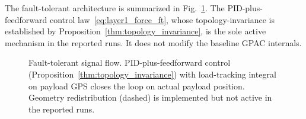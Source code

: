 The fault-tolerant architecture is summarized in Fig.~\ref{fig:control_signal_flow}. The PID-plus-feedforward control law~\eqref{eq:layer1_force_ft}, whose topology-invariance is established by Proposition~\ref{thm:topology_invariance}, is the sole active mechanism in the reported runs. It does not modify the baseline GPAC internals.

\begin{figure}
\centering

\caption{Fault-tolerant signal flow. PID-plus-feedforward control (Proposition~\ref{thm:topology_invariance}) with load-tracking integral on payload GPS closes the loop on actual payload position. Geometry redistribution (dashed) is implemented but not active in the reported runs.}
\label{fig:control_signal_flow}
\end{figure}
